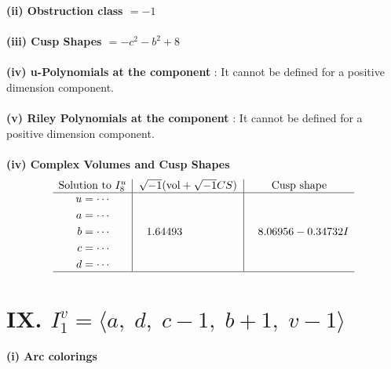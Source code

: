 \documentclass[1p]{elsarticle_modified}
\theoremstyle{definition}
\newcommand{\I}{\sqrt{-1}}
\begin{document}
\flushleft \textbf{(ii) Obstruction class $= -1$}\\~\\
\flushleft \textbf{(iii) Cusp Shapes $= - c^2- b^2+8$}\\~\\
\flushleft \textbf{(iv) u-Polynomials at the component} : It cannot be defined for a positive dimension component.\\~\\
\flushleft \textbf{(v) Riley Polynomials at the component} : It cannot be defined for a positive dimension component.\\~\\
\newpage\flushleft \textbf{(iv) Complex Volumes and Cusp Shapes}
$$\begin{array}{c|c|c} 
\text{Solution to }I^u_{8}& \I (\text{vol} + \sqrt{-1}CS) & \text{Cusp shape}\\
 \hline 
\begin{aligned}
u &= \cdots \\
a &= \cdots \\
b &= \cdots \\
c &= \cdots \\
d &= \cdots\end{aligned}
 & \phantom{-}1.64493\phantom{ +0.000000I} & \phantom{-}8.06956 - 0.34732 I\\
 \hline 
 \end{array}
$$\newpage\renewcommand{\arraystretch}{1}
\centering \section*{IX. $I^v_{1}= \langle a,\;d,\;c-1,\;b+1,\;v-1 \rangle$}
\flushleft \textbf{(i) Arc colorings}\\
\end{document}
